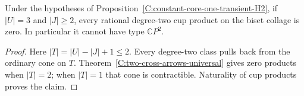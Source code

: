 \begin{corollary}\label{C:three-constant-four-state-cups}
Under the hypotheses of
Proposition~\ref{C:constant-core-one-transient-H2}, if
$|U|=3$ and $|J|\geq2$, every rational degree-two cup product
on the biset collage is zero.  In particular it cannot have
type $\mathbb CP^2$.
\end{corollary}
\begin{proof}
Here $|T|=|U|-|J|+1\leq2$.
Every degree-two class pulls back from the ordinary cone on
$T$.  Theorem~\ref{C:two-cross-arrows-universal} gives zero
products when $|T|=2$; when $|T|=1$ that cone is contractible.
Naturality of cup products proves the claim.
\end{proof}
